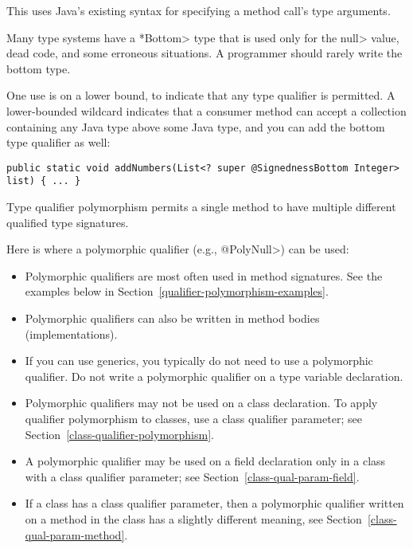 \noindent
This uses Java's existing syntax for specifying a method call's type arguments.



Many type systems have a \<*Bottom> type that is used only for the \<null>
value, dead code, and some erroneous situations.  A programmer should
rarely write the bottom type.

One use is on a lower bound, to indicate that any type qualifier is
permitted.  A lower-bounded wildcard indicates that a consumer method can
accept a collection containing any Java type above some Java type, and you
can add the bottom type qualifier as well:

\begin{Verbatim}
public static void addNumbers(List<? super @SignednessBottom Integer> list) { ... }
\end{Verbatim}



Type qualifier polymorphism permits a single method to have multiple different qualified
type signatures.

Here is where a polymorphic qualifier (e.g., \<@PolyNull>) can be used:
\begin{itemize}
\item Polymorphic qualifiers are most often used in method signatures.
  See the examples below in Section~\ref{qualifier-polymorphism-examples}.
\item Polymorphic qualifiers can also be written in method bodies
  (implementations).
\item If you can use generics, you typically do not need to use a
  polymorphic qualifier.  Do not write a polymorphic qualifier on a type
  variable declaration.
\item Polymorphic qualifiers may not be used on a class declaration.
  To apply qualifier polymorphism to classes, use a class qualifier
  parameter; see Section~\ref{class-qualifier-polymorphism}.
\item A polymorphic qualifier may be used on a field declaration only in a
  class with a class qualifier parameter; see Section~\ref{class-qual-param-field}.
\item If a class has a class qualifier parameter, then a polymorphic
  qualifier written on a method in the class has a slightly different
  meaning, see Section~\ref{class-qual-param-method}.
\end{itemize}


